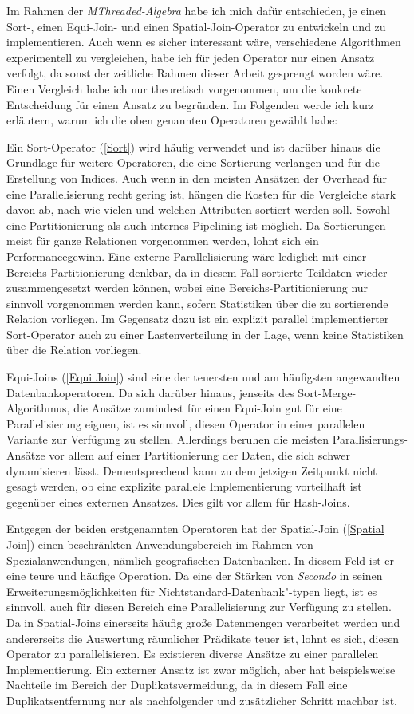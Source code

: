 \documentclass[a4paper,12pt,twoside]{article}
\newcommand{\Fb}[1]{\textit{#1}} %
\begin{document}
Im Rahmen der \Fb{MThreaded-Algebra} habe ich mich dafür entschieden, je einen Sort-, einen Equi-Join- und einen Spatial-Join-Operator zu entwickeln und zu implementieren. Auch wenn es sicher interessant wäre, verschiedene Algorithmen experimentell zu vergleichen, habe ich für jeden Operator nur einen Ansatz verfolgt, da sonst der zeitliche Rahmen dieser Arbeit gesprengt worden wäre. Einen Vergleich habe ich nur theoretisch vorgenommen, um die konkrete Entscheidung für einen Ansatz zu begründen. Im Folgenden werde ich kurz erläutern, warum ich die oben genannten Operatoren gewählt habe:

Ein Sort-Operator (\autoref{Sort}) wird häufig verwendet und ist darüber hinaus die Grundlage für weitere Operatoren, die eine Sortierung verlangen und für die Erstellung von Indices. Auch wenn in den meisten Ansätzen der Overhead für eine Parallelisierung recht gering ist, hängen die Kosten für die Vergleiche stark davon ab, nach wie vielen und welchen Attributen sortiert werden soll. Sowohl eine Partitionierung als auch internes Pipelining ist möglich. Da Sortierungen meist für ganze Relationen vorgenommen werden, lohnt sich ein Performancegewinn. Eine externe Parallelisierung wäre lediglich mit einer Bereichs-Partitionierung denkbar, da in diesem Fall sortierte Teildaten wieder zusammengesetzt werden können, wobei eine Bereichs-Partitionierung nur sinnvoll vorgenommen werden kann, sofern Statistiken über die zu sortierende Relation vorliegen. Im Gegensatz dazu ist ein explizit parallel implementierter Sort-Operator auch zu einer Lastenverteilung in der Lage, wenn keine Statistiken über die Relation vorliegen.

Equi-Joins (\autoref{Equi Join}) sind eine der teuersten und am häufigsten angewandten Datenbankoperatoren. Da sich darüber hinaus, jenseits des Sort-Merge-Algorithmus, die Ansätze zumindest für einen Equi-Join gut für eine Parallelisierung eignen, ist es sinnvoll, diesen Operator in einer parallelen Variante zur Verfügung zu stellen. Allerdings beruhen die meisten Parallisierungs-Ansätze vor allem auf einer Partitionierung der Daten, die sich schwer dynamisieren lässt. Dementsprechend kann zu dem jetzigen Zeitpunkt nicht gesagt werden, ob eine explizite parallele Implementierung vorteilhaft ist gegenüber eines externen Ansatzes. Dies gilt vor allem für Hash-Joins.

Entgegen der beiden erstgenannten Operatoren hat der Spatial-Join (\autoref{Spatial Join}) einen beschränkten Anwendungsbereich im Rahmen von Spezialanwendungen, nämlich geografischen Datenbanken. In diesem Feld ist er eine teure und häufige Operation. Da eine der Stärken von \Fb{Secondo} in seinen Erweiterungsmöglichkeiten für Nichtstandard-Datenbank"-typen liegt, ist es sinnvoll, auch für diesen Bereich eine Parallelisierung zur Verfügung zu stellen. Da in Spatial-Joins einerseits häufig große Datenmengen verarbeitet werden und andererseits die Auswertung räumlicher Prädikate teuer ist, lohnt es sich, diesen Operator zu parallelisieren. Es existieren diverse Ansätze zu einer parallelen Implementierung. Ein externer Ansatz ist zwar möglich, aber hat beispielsweise Nachteile im Bereich der Duplikatsvermeidung, da in diesem Fall eine Duplikatsentfernung nur als nachfolgender und zusätzlicher Schritt machbar ist. 
\end{document}
